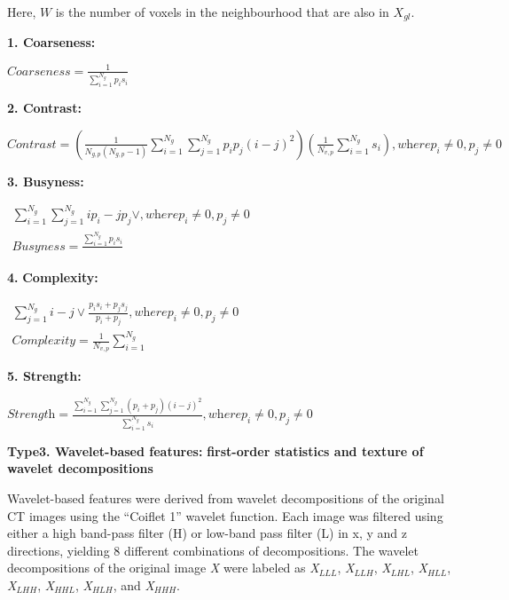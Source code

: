 Here, $W$ is the number of voxels in the neighbourhood that are also in $X_{gl}$.

\textbf{1. Coarseness:}

$\textit{Coarseness}=\frac{1}{\sum _{i=1}^{N_{g}}p_{i}s_{i}}$

\textbf{2. Contrast:}

$\textit{Contrast}=\left(\frac{1}{N_{g,p}\left(N_{g,p}-1\right)}\sum _{i=1}^{N_{g}}\sum _{j=1}^{N_{g}}p_{i}p_{j}\left(i-j\right)^{2}\right)\left(\frac{1}{N_{v,p}}\sum _{i=1}^{N_{g}}s_{i}\right),\textit{where}p_{i}\neq 0,p_{j}\neq 0$

\textbf{3. Busyness:}

$\begin{array}{c}
\sum _{i=1}^{N_{g}}\sum _{j=1}^{N_{g}}ip_{i}-jp_{j}\vee ,\textit{where}p_{i}\neq 0,p_{j}\neq 0\\
\textit{Busyness}=\frac{\sum _{i=1}^{N_{g}}{p_{i}}s_{i}}{}
\end{array}$

\textbf{4.} \textbf{Complexity:}

$\begin{array}{c}
\sum _{j=1}^{N_{g}}i-j\vee \frac{{p_{i}}s_{i}+{p_{j}}s_{j}}{p_{i}+p_{j}},\textit{where}p_{i}\neq 0,p_{j}\neq 0\\
\textit{Complexity}=\frac{1}{N_{v,p}}\sum _{i=1}^{N_{g}}
\end{array}$

\textbf{5. Strength:}

$\textit{Strength}=\frac{\sum _{i=1}^{N_{g}}\sum _{j=1}^{N_{g}}\left(p_{i}+p_{j}\right)\left(i-j\right)^{2}}{\sum _{i=1}^{N_{g}}s_{i}},\textit{where}p_{i}\neq 0,p_{j}\neq 0$

\textbf{Type3. Wavelet-based features:} \textbf{first-order statistics and texture of wavelet decompositions}

Wavelet-based features were derived from wavelet decompositions of the original CT images using the “Coiflet 1” wavelet function. Each image was filtered using either a high band-pass filter (H) or low-band pass filter (L) in x, y and z directions, yielding 8 different combinations of decompositions. The wavelet decompositions of the original image \textit{X} were labeled as \textit{X}$_{LLL}$, \textit{X}$_{LLH}$, \textit{X}$_{LHL}$, \textit{X}$_{HLL}$, \textit{X}$_{LHH}$, \textit{X}$_{HHL}$, \textit{X}$_{HLH}$, and \textit{X}$_{HHH}$.


